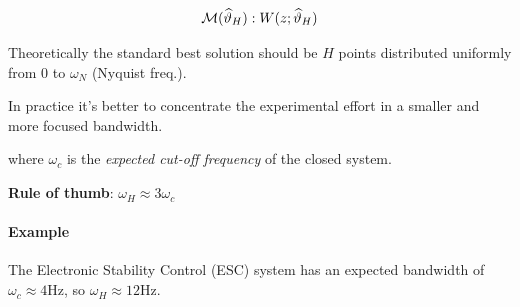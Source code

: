 \[
    \mathcal{M}(\widehat{\vartheta}_H): W(z; \widehat{\vartheta}_H)
\]


\begin{remark}[Frequency bandwidth selection $\omega_H =\; ?$]
    Theoretically the standard best solution should be $H$ points distributed uniformly from 0 to $\omega_N$ (Nyquist freq.).

    In practice it's better to concentrate the experimental effort in a smaller and more focused bandwidth.

    \begin{figure}[H]
        \centering
    \end{figure}

    where $\omega_c$ is the \emph{expected cut-off frequency} of the closed system.
    
    \textbf{Rule of thumb}: $\omega_H \approx 3\omega_c$

    \paragraph{Example} The Electronic Stability Control (ESC) system has an expected bandwidth of $\omega_c \approx 4 \text{Hz}$, so $\omega_H \approx 12\text{Hz}$.
\end{remark}

